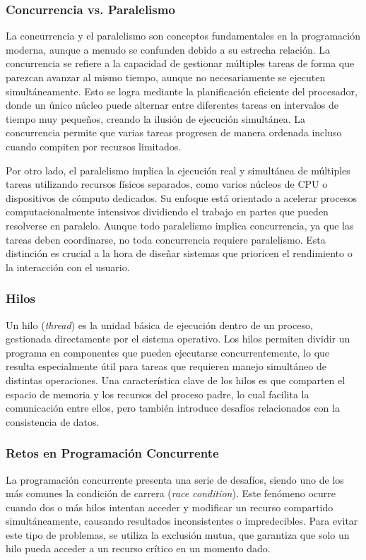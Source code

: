 \subsubsection{Concurrencia vs. Paralelismo}
La concurrencia y el paralelismo son conceptos fundamentales en la programación moderna, aunque a menudo se confunden debido a su estrecha relación. La concurrencia se refiere a la capacidad de gestionar múltiples tareas de forma que parezcan avanzar al mismo tiempo, aunque no necesariamente se ejecuten simultáneamente. Esto se logra mediante la planificación eficiente del procesador, donde un único núcleo puede alternar entre diferentes tareas en intervalos de tiempo muy pequeños, creando la ilusión de ejecución simultánea. La concurrencia permite que varias tareas progresen de manera ordenada incluso cuando compiten por recursos limitados.

Por otro lado, el paralelismo implica la ejecución real y simultánea de múltiples tareas utilizando recursos físicos separados, como varios núcleos de CPU o dispositivos de cómputo dedicados. Su enfoque está orientado a acelerar procesos computacionalmente intensivos dividiendo el trabajo en partes que pueden resolverse en paralelo. Aunque todo paralelismo implica concurrencia, ya que las tareas deben coordinarse, no toda concurrencia requiere paralelismo. Esta distinción es crucial a la hora de diseñar sistemas que prioricen el rendimiento o la interacción con el usuario.

\subsubsection{Hilos}
Un hilo (\textit{thread}) es la unidad básica de ejecución dentro de un proceso, gestionada directamente por el sistema operativo. Los hilos permiten dividir un programa en componentes que pueden ejecutarse concurrentemente, lo que resulta especialmente útil para tareas que requieren manejo simultáneo de distintas operaciones. Una característica clave de los hilos es que comparten el espacio de memoria y los recursos del proceso padre, lo cual facilita la comunicación entre ellos, pero también introduce desafíos relacionados con la consistencia de datos.



\subsubsection{Retos en Programación Concurrente}
La programación concurrente presenta una serie de desafíos, siendo uno de los más comunes la condición de carrera (\textit{race condition}). Este fenómeno ocurre cuando dos o más hilos intentan acceder y modificar un recurso compartido simultáneamente, causando resultados inconsistentes o impredecibles. Para evitar este tipo de problemas, se utiliza la exclusión mutua, que garantiza que solo un hilo pueda acceder a un recurso crítico en un momento dado.

